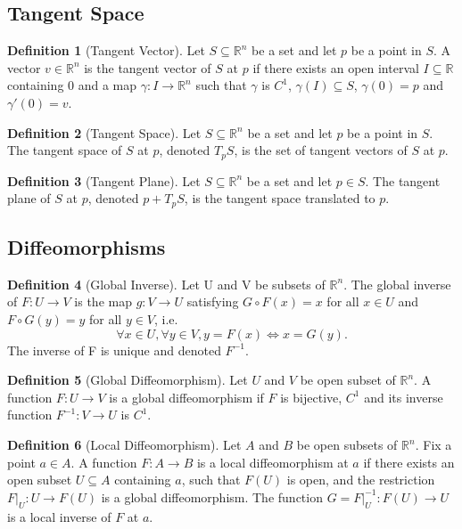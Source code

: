 \documentclass[12pt]{article}
\theoremstyle{definition}
\newtheorem{definition}{Definition}[subsection]
\theoremstyle{remark}
\begin{document}
\subsection{Tangent Space}
\begin{definition}[Tangent Vector]
Let $S\subseteq\mathbb{R}^n$ be a set and let $p$ be a point in $S$. A vector $v\in\mathbb{R}^n$ is the tangent vector of $S$ at $p$ if there exists an open interval $I\subseteq\mathbb{R}$ containing 0 and a map $\gamma:I\to\mathbb{R}^n$ such that $\gamma$ is $C^1$, $\gamma(I)\subseteq S$, $\gamma(0)=p$ and $\gamma'(0)=v$.
\end{definition}

\begin{definition}[Tangent Space]
Let $S\subseteq\mathbb{R}^n$ be a set and let $p$ be a point in $S$. The tangent space of $S$ at $p$, denoted $T_pS$, is the set of tangent vectors of $S$ at $p$.
\end{definition}

\begin{definition}[Tangent Plane]
Let $S\subseteq\mathbb{R}^n$ be a set and let $p\in S$. The tangent plane of $S$ at $p$, denoted $p+T_pS$, is the tangent space translated to $p$.
\end{definition}

\subsection{Diffeomorphisms}
\begin{definition}[Global Inverse]
Let U and V be subsets of $\mathbb{R}^n$. The global inverse of $F: U\rightarrow V$ is the map $g: V\rightarrow U$ satisfying $G\circ F(x)=x$ for all $x\in U$ and $F\circ G(y)=y$ for all $y\in V$, i.e.
\[
\forall x\in U, \forall y\in V, y=F(x)\Longleftrightarrow x=G(y). 
\]
The inverse of F is unique and denoted $F^{-1}$.
\end{definition}

\begin{definition}[Global Diffeomorphism]
Let $U$ and $V$ be open subset of $\mathbb{R}^n$. A function $F:U\rightarrow V$ is a global diffeomorphism if $F$ is bijective, $C^1$ and its inverse function $F^{-1}:V\rightarrow U$ is $C^1.$
\end{definition}

\begin{definition}[Local Diffeomorphism]
Let $A$ and $B$ be open subsets of $\mathbb{R}^n.$ Fix a point $a\in A.$ A function $F:A\rightarrow B$ is a local diffeomorphism at $a$ if there exists an open subset $U\subseteq A$ containing $a$, such that $F(U)$ is open, and the restriction $F|_U: U\rightarrow F(U)$ is a global diffeomorphism. The function $G=F|_U^{-1}: F(U)\rightarrow U$ is a local inverse of $F$ at $a.$
\end{definition}
\end{document}
